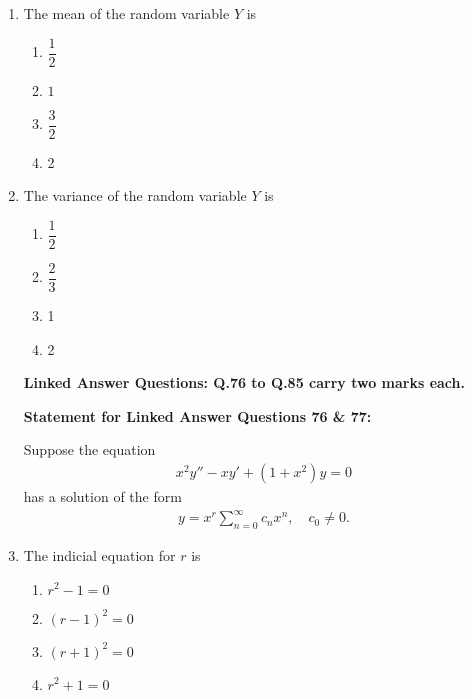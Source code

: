 \documentclass[journal]{IEEEtran}
\numberwithin{equation}{enumi}
\numberwithin{figure}{enumi}
\begin{document}
\begin{enumerate}
\item The mean of the random variable $Y$ is
\hfill{}
\begin{multicols}{4}
    \begin{enumerate}
        \item  $\dfrac{1}{2}$
        \item $1$
        \item $\dfrac{3}{2}$
        \item 2
    \end{enumerate}
    \end{multicols}
\newpage

\item The variance of the random variable $Y$ is
\hfill{}
\begin{multicols}{4}
    \begin{enumerate}
        \item $\dfrac{1}{2}$
        \item $\dfrac{2}{3}$
        \item 1
        \item 2
    \end{enumerate}
    \end{multicols}


\bigskip
\begin{center}
 \textbf{Linked Answer Questions: Q.76 to Q.85 carry two marks each.}   
\end{center}
\vspace{1em}

\textbf{Statement for Linked Answer Questions 76 \& 77:}  

Suppose the equation  
\begin{align*}
x^2 y'' - x y' + (1 + x^2) y = 0
\end{align*}
has a solution of the form  
\begin{align*}
y = x^r \sum_{n=0}^{\infty} c_n x^n,\quad c_0 \neq 0.
\end{align*}

\item The indicial equation for $r$ is
\hfill{}
\begin{multicols}{2}
    \begin{enumerate}
        \item  $r^2 - 1 = 0$
        \item $(r - 1)^2 = 0$
        \item $(r + 1)^2 = 0$ 
        \item $r^2 + 1 = 0$
    \end{enumerate}
    \end{multicols}





\end{enumerate}
\end{document}
